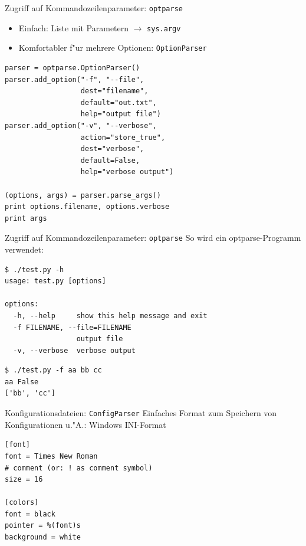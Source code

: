 \begin{frame}[fragile]{Zugriff auf Kommandozeilenparameter: \texttt{optparse}}
\begin{itemize}
\item Einfach: Liste mit Parametern $\rightarrow$ \texttt{sys.argv}
\item Komfortabler f"ur mehrere Optionen: \texttt{OptionParser}
\end{itemize}
\begin{lstlisting}[style=Python]
parser = optparse.OptionParser()
parser.add_option("-f", "--file", 
                  dest="filename",
                  default="out.txt",
                  help="output file")
parser.add_option("-v", "--verbose",
                  action="store_true", 
                  dest="verbose", 
                  default=False,
                  help="verbose output")

(options, args) = parser.parse_args()
print options.filename, options.verbose
print args
\end{lstlisting}
\end{frame}
\begin{frame}[fragile]{Zugriff auf Kommandozeilenparameter: \texttt{optparse}}
So wird ein optparse-Programm verwendet:
\begin{lstlisting}[style=Shell]
$ ./test.py -h
usage: test.py [options]

options:
  -h, --help     show this help message and exit
  -f FILENAME, --file=FILENAME
                 output file
  -v, --verbose  verbose output
\end{lstlisting} %
\begin{lstlisting}[style=Shell]
$ ./test.py -f aa bb cc
aa False
['bb', 'cc']
\end{lstlisting} %
\end{frame}

\begin{frame}[fragile]{Konfigurationsdateien: \texttt{ConfigParser}}
Einfaches Format zum Speichern von Konfigurationen u."A.: Windows INI-Format
\begin{lstlisting}[style=Python]
[font]
font = Times New Roman
# comment (or: ! as comment symbol)
size = 16

[colors]
font = black
pointer = %(font)s
background = white
\end{lstlisting}
\end{frame}

